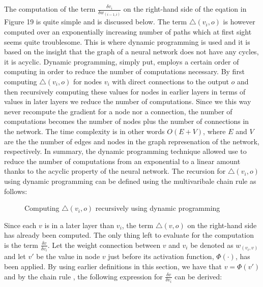 \documentclass[titlepage]{article}
\begin{document}
\noindent
The computation of the term $\frac{\delta v_{i}}{\delta w_{(i-1, i)}}$ on the right-hand side of the eqation in Figure 19 is quite simple and is discussed below. The term $\triangle (v_{i}, o)$ is however computed over an exponentially increasing number of paths which at first sight seems quite troublesome. This is where dynamic programming is used and it is based on the insight that the graph of a neural network does not have any cycles, it is acyclic. Dynamic programming, simply put, employs a certain order of computing in order to reduce the number of computations necessary. By first computing $\triangle (v_{i}, o)$ for nodes $v_{i}$ with direct connections to the output $o$ and then recursively computing these values for nodes in earlier layers in terms of values in later layers we reduce the number of computations. Since we this way never recompute the gradient for a node nor a connection, the number of computations becomes the number of nodes plus the number of connections in the network. The time complexity is in other words $O(E + V)$, where $E$ and $V$ are the the number of edges and nodes in the graph represenation of the network, respectively. In summary, the dynamic programming technique allowed use to reduce the number of computations from an exponential to a linear amount thanks to the acyclic property of the neural network. The recursion for $\triangle (v_{i}, o)$ using dynamic programming can be defined using the multivaribale chain rule as follows:

\vskip 0.3cm

\begin{figure}[h]
    \centerline{
    }
    \vskip 0.3cm
    \caption{Computing $\triangle (v_{i}, o)$ recursively using dynamic programming}
\end{figure}

\vskip 0.2cm

\noindent
Since each $v$ is in a later layer than $v_{i}$, the term $\triangle (v, o)$ on the right-hand side has already been computed. The only thing left to evaluate for the computation is the term $\frac{\delta v}{\delta v_{i}}$. Let the weight connection between $v$ and $v_{i}$ be denoted as $w_{(v_{i}, v)}$ and let $v'$ be the value in node $v$ just before its activation function, $\Phi(\cdot)$, has been applied. By using earlier definitions in this section, we have that $v = \Phi(v')$ and by the chain rule \cite{charu}, the following expression for $\frac{\delta v}{\delta v_{i}}$ can be derived:
\end{document}
